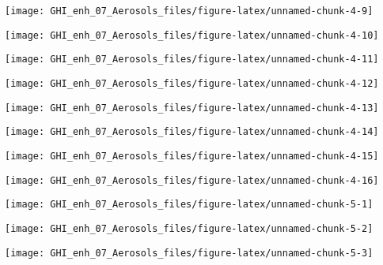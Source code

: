 \documentclass[
  10pt,
  a4paper,oneside]{article}
\begin{document}
\begin{center}\texttt{[image: GHI\_enh\_07\_Aerosols\_files/figure-latex/unnamed-chunk-4-9]} \end{center}

\begin{center}\texttt{[image: GHI\_enh\_07\_Aerosols\_files/figure-latex/unnamed-chunk-4-10]} \end{center}

\begin{center}\texttt{[image: GHI\_enh\_07\_Aerosols\_files/figure-latex/unnamed-chunk-4-11]} \end{center}

\begin{center}\texttt{[image: GHI\_enh\_07\_Aerosols\_files/figure-latex/unnamed-chunk-4-12]} \end{center}

\begin{center}\texttt{[image: GHI\_enh\_07\_Aerosols\_files/figure-latex/unnamed-chunk-4-13]} \end{center}

\begin{center}\texttt{[image: GHI\_enh\_07\_Aerosols\_files/figure-latex/unnamed-chunk-4-14]} \end{center}

\begin{center}\texttt{[image: GHI\_enh\_07\_Aerosols\_files/figure-latex/unnamed-chunk-4-15]} \end{center}

\begin{center}\texttt{[image: GHI\_enh\_07\_Aerosols\_files/figure-latex/unnamed-chunk-4-16]} \end{center}

\begin{center}\texttt{[image: GHI\_enh\_07\_Aerosols\_files/figure-latex/unnamed-chunk-5-1]} \end{center}

\begin{center}\texttt{[image: GHI\_enh\_07\_Aerosols\_files/figure-latex/unnamed-chunk-5-2]} \end{center}

\begin{center}\texttt{[image: GHI\_enh\_07\_Aerosols\_files/figure-latex/unnamed-chunk-5-3]} \end{center}
\end{document}
